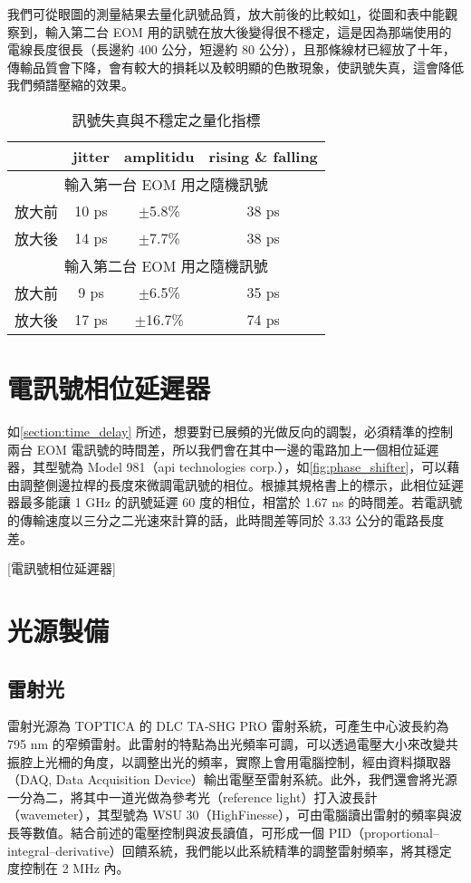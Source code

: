 \documentclass[class=NCU_thesis, crop=false]{standalone}
\begin{document}
我們可從眼圖的測量結果去量化訊號品質，放大前後的比較如\cref{tab:amplifier_compare}，從圖和表中能觀察到，輸入第二台 EOM 用的訊號在放大後變得很不穩定，這是因為那端使用的電線長度很長（長邊約 400 公分，短邊約 80 公分），且那條線材已經放了十年，傳輸品質會下降，會有較大的損耗以及較明顯的色散現象，使訊號失真，這會降低我們頻譜壓縮的效果。

\begin{table}[h]
    \centering
    \caption{訊號失真與不穩定之量化指標}
    \begin{tabular}{| c | c | c | c |}
\hline
         & jitter & amplitidu & rising \& falling
    \\ \hline
    \multicolumn{4}{|c|}{輸入第一台 EOM 用之隨機訊號}\\ \hline
    放大前 & 10 ps & $\pm$5.8\% & 38 ps\\ \hline
    放大後 & 14 ps & $\pm$7.7\% & 38 ps\\ \hline
    \multicolumn{4}{|c|}{輸入第二台 EOM 用之隨機訊號}\\ \hline
    放大前 & 9 ps & $\pm$6.5\% & 35 ps\\ \hline
    放大後 & 17 ps & $\pm$16.7\% & 74 ps\\ \hline
    \end{tabular}
    \label{tab:amplifier_compare}
\end{table}

\section{電訊號相位延遲器}
如\cref{section:time_delay} 所述，想要對已展頻的光做反向的調製，必須精準的控制兩台 EOM 電訊號的時間差，所以我們會在其中一邊的電路加上一個相位延遲器，其型號為 Model 981（api technologies corp.），如\cref{fig:phase_shifter}，可以藉由調整側邊拉桿的長度來微調電訊號的相位。根據其規格書上的標示，此相位延遲器最多能讓 1 GHz 的訊號延遲 60 度的相位，相當於 1.67 ns 的時間差。若電訊號的傳輸速度以三分之二光速來計算的話，此時間差等同於 3.33 公分的電路長度差。

[電訊號相位延遲器]

\section{光源製備}

\subsection{雷射光}
雷射光源為 TOPTICA 的 DLC TA-SHG PRO 雷射系統，可產生中心波長約為 795 nm 的窄頻雷射。此雷射的特點為出光頻率可調，可以透過電壓大小來改變共振腔上光柵的角度，以調整出光的頻率，實際上會用電腦控制，經由資料擷取器（DAQ, Data Acquisition Device）輸出電壓至雷射系統。此外，我們還會將光源一分為二，將其中一道光做為參考光（reference light）打入波長計（wavemeter），其型號為 WSU 30（HighFinesse），可由電腦讀出雷射的頻率與波長等數值。結合前述的電壓控制與波長讀值，可形成一個 PID（proportional–integral–derivative）回饋系統，我們能以此系統精準的調整雷射頻率，將其穩定度控制在 2 MHz 內。
\end{document}

